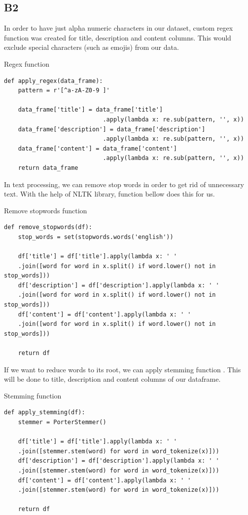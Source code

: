 \subsection{B2}\label{B2}

In order to have just alpha numeric characters in our dataset, custom regex function was created for title, description and content columns. This would exclude special characters (such as emojis) from our data.
\begin{listing}[H]
\caption{Regex function}
\begin{verbatim}
def apply_regex(data_frame):
    pattern = r'[^a-zA-Z0-9 ]'

    data_frame['title'] = data_frame['title']
                            .apply(lambda x: re.sub(pattern, '', x))
    data_frame['description'] = data_frame['description']
                            .apply(lambda x: re.sub(pattern, '', x))
    data_frame['content'] = data_frame['content']
                            .apply(lambda x: re.sub(pattern, '', x))
    return data_frame
\end{verbatim}
\end{listing}

In text processing, we can remove stop words \parencite{vijayarani2015preprocessing} in order to get rid of unnecessary text. With the help of NLTK \parencite{web:Nltk} library, function bellow does this for us.
\begin{listing}[H]
\caption{Remove stopwords function}
\begin{verbatim}
def remove_stopwords(df):
    stop_words = set(stopwords.words('english'))

    df['title'] = df['title'].apply(lambda x: ' '
    .join([word for word in x.split() if word.lower() not in stop_words]))
    df['description'] = df['description'].apply(lambda x: ' '
    .join([word for word in x.split() if word.lower() not in stop_words]))
    df['content'] = df['content'].apply(lambda x: ' '
    .join([word for word in x.split() if word.lower() not in stop_words]))

    return df
\end{verbatim}
\end{listing}

If we want to reduce words to its root, we can apply stemming function \parencite{jivani2011comparative}. This will be done to title, description and content columns of our dataframe.
\begin{listing}[H]
\caption{Stemming function}
\begin{verbatim}
def apply_stemming(df):
    stemmer = PorterStemmer()

    df['title'] = df['title'].apply(lambda x: ' '
    .join([stemmer.stem(word) for word in word_tokenize(x)]))
    df['description'] = df['description'].apply(lambda x: ' '
    .join([stemmer.stem(word) for word in word_tokenize(x)]))
    df['content'] = df['content'].apply(lambda x: ' '
    .join([stemmer.stem(word) for word in word_tokenize(x)]))

    return df
\end{verbatim}
\end{listing}

